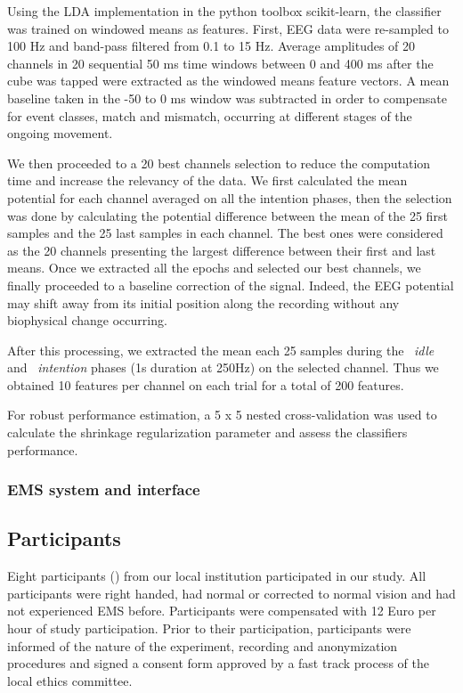 Using the LDA implementation in the python toolbox scikit-learn, the classifier was trained on windowed means as features. First, EEG data were re-sampled to 100 Hz and band-pass filtered from 0.1 to 15 Hz. Average amplitudes of 20 channels in 20 sequential 50 ms time windows between 0 and 400 ms after the cube was tapped were extracted as the windowed means feature vectors. A mean baseline taken in the -50 to 0 ms window was subtracted in order to compensate for event classes, match and mismatch, occurring at different stages of the ongoing movement. 

We then proceeded to a 20 best channels selection to reduce the computation time and increase the relevancy of the data. We first calculated the mean potential for each channel averaged on all the intention phases, then the selection was done by calculating the potential difference between the mean of the 25 first samples and the 25 last samples in each channel. The best ones were considered as the 20 channels presenting the largest difference between their first and last means.
Once we extracted all the epochs and selected our best channels, we finally proceeded to a baseline correction of the signal. Indeed, the EEG potential may shift away from its initial position along the recording without any biophysical change occurring.

After this processing, we extracted the mean each 25 samples during the ~\textit{idle} and ~\textit{intention} phases (1s duration at 250Hz) on the selected channel. Thus we obtained 10 features per channel on each trial for a total of 200 features.

For robust performance estimation, a 5 x 5 nested cross-validation was used to calculate the shrinkage regularization parameter and assess the classifiers performance.

\subsubsection{EMS system and interface}


\subsection{Participants}

 Eight participants () from our local institution participated in our study. All participants were right handed, had normal or corrected to normal vision and had not experienced EMS before. Participants were compensated with 12 Euro per hour of study participation. Prior to their participation, participants were informed of the nature of the experiment, recording and anonymization procedures and signed a consent form approved by a fast track process of the local ethics committee.

